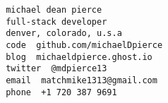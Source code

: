 \documentclass[a5paper,landscape]{article}
\newcommand{\green}[1]{\texttt{\color{ForestGreen} #1}}
\newcommand{\blue}[1]{\texttt{\color{Blue} #1}}
\newcommand{\red}[1]{\texttt{\color{Red} #1}}
\begin{document}
\noindent
\Huge
\red{michael dean pierce} \\
\red{full-stack developer} \\
\red{denver, colorado, u.s.a} \\
\blue{code }\green{github.com/michaelDpierce} \\
\blue{blog }\green{michaeldpierce.ghost.io} \\
\blue{twitter }\green{@mdpierce13} \\
\blue{email }\green{matchmike1313@gmail.com} \\
\blue{phone }\green{+1 720 387 9691}
\end{document}
